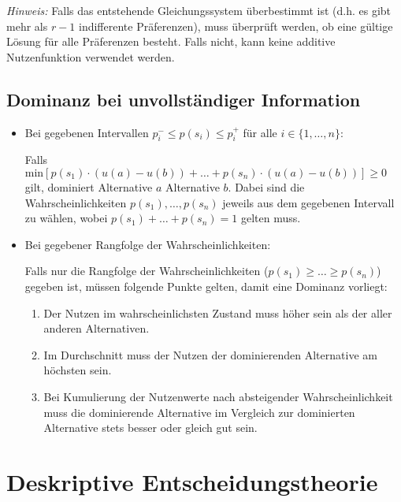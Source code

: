 \documentclass{panikzettel}
\begin{document}
\textit{Hinweis:} Falls das entstehende Gleichungssystem überbestimmt ist (d.h. es gibt mehr als $ r-1 $ indifferente Präferenzen), muss überprüft werden, ob eine gültige Lösung für alle Präferenzen besteht. Falls nicht, kann keine additive Nutzenfunktion verwendet werden.

\subsection{Dominanz bei unvollständiger Information}
\begin{itemize}
	\item Bei gegebenen Intervallen $ p^-_i \leq p(s_i) \leq p^+_i $ für alle $ i\in\{1,\dots,n\} $:

	Falls $ \text{min} \left[p(s_1) \cdot (u(a) - u(b)) + \dots + p(s_n) \cdot (u(a) - u(b)) \right] \geq 0$ gilt, dominiert Alternative $ a $ Alternative $ b $. Dabei sind die Wahrscheinlichkeiten $ p(s_1), \dots, p(s_n) $ jeweils aus dem gegebenen Intervall zu wählen, wobei $ p(s_1) + \dots + p(s_n) = 1 $ gelten muss.

	\item Bei gegebener Rangfolge der Wahrscheinlichkeiten:

	Falls nur die Rangfolge der Wahrscheinlichkeiten ($ p(s_1) \geq \dots \geq p(s_n) $) gegeben ist, müssen folgende Punkte gelten, damit eine Dominanz vorliegt:
	\begin{enumerate}
		\item Der Nutzen im wahrscheinlichsten Zustand muss höher sein als der aller anderen Alternativen.
		\item Im Durchschnitt muss der Nutzen der dominierenden Alternative am höchsten sein.
		\item Bei Kumulierung der Nutzenwerte nach absteigender Wahrscheinlichkeit muss die dominierende Alternative im Vergleich zur dominierten Alternative stets besser oder gleich gut sein.
	\end{enumerate}
\end{itemize}

\newpage
\section{Deskriptive Entscheidungstheorie}
\end{document}
